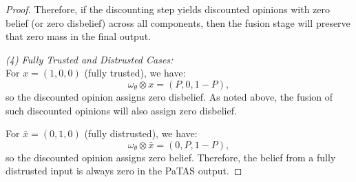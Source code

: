 \begin{proof}
Therefore, if the discounting step yields discounted opinions with zero belief (or zero disbelief) across all components, then the fusion stage will preserve that zero mass in the final output.

\emph{(4) Fully Trusted and Distrusted Cases:} \\
For $x = (1, 0, 0)$ (fully trusted), we have:
\[
\omega_\theta \otimes x = (P, 0, 1 - P),
\]
so the discounted opinion assigns zero disbelief. As noted above, the fusion of such discounted opinions will also assign zero disbelief.

For $\bar{x} = (0, 1, 0)$ (fully distrusted), we have:
\[
\omega_\theta \otimes \bar{x} = (0, P, 1 - P),
\]
so the discounted opinion assigns zero belief. Therefore, the belief from a fully distrusted input is always zero in the PaTAS output.
\end{proof}

